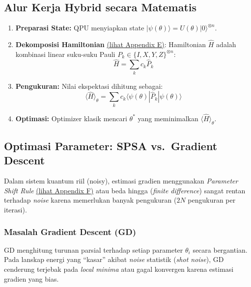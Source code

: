 \documentclass[12pt,a4paper]{article}
\providecommand{\tightlist}{%
  \setlength{\itemsep}{0pt}\setlength{\parskip}{0pt}}
\begin{document}
\hypertarget{a.-alur-kerja-hybrid-secara-matematis}{%
\subsection{Alur Kerja Hybrid secara Matematis}\label{a.-alur-kerja-hybrid-secara-matematis}}

\begin{enumerate}
\def\labelenumi{\arabic{enumi}.}
\tightlist
\item
  \textbf{Preparasi State:} QPU menyiapkan state \(|\psi(\theta)\rangle = U(\theta)|0\rangle^{\otimes n}\).
\item
  \textbf{Dekomposisi Hamiltonian} \hyperref[appendix-e]{(lihat Appendix E)}: Hamiltonian \(\hat{H}\) adalah kombinasi linear suku-suku Pauli \(P_k \in \{I, X, Y, Z\}^{\otimes n}\): \[ \hat{H} = \sum_k c_k \hat{P}_k \]
\item
  \textbf{Pengukuran:} Nilai ekspektasi dihitung sebagai: \[ \langle \hat{H} \rangle_{\theta} = \sum_k c_k \langle \psi(\theta) | \hat{P}_k | \psi(\theta) \rangle \]
\item
  \textbf{Optimasi:} Optimizer klasik mencari \(\theta^*\) yang meminimalkan \(\langle \hat{H} \rangle_{\theta}\).
\end{enumerate}

\hypertarget{b.-optimasi-parameter-spsa-vs.-gradient-descent}{%
\subsection{Optimasi Parameter: SPSA vs.~Gradient Descent}\label{b.-optimasi-parameter-spsa-vs.-gradient-descent}}

Dalam sistem kuantum riil (noisy), estimasi gradien menggunakan \textit{Parameter Shift Rule} \hyperref[appendix-f]{(lihat Appendix F)} atau beda hingga (\textit{finite difference}) sangat rentan terhadap \emph{noise} karena memerlukan banyak pengukuran (\(2N\) pengukuran per iterasi).

\hypertarget{masalah-gradient-descent-gd}{%
\subsubsection{Masalah Gradient Descent (GD)}\label{masalah-gradient-descent-gd}}

GD menghitung turunan parsial terhadap setiap parameter \(\theta_i\) secara bergantian. Pada lanskap energi yang ``kasar'' akibat \emph{noise} statistik (\emph{shot noise}), GD cenderung terjebak pada \emph{local minima} atau gagal konvergen karena estimasi gradien yang bias.
\end{document}
